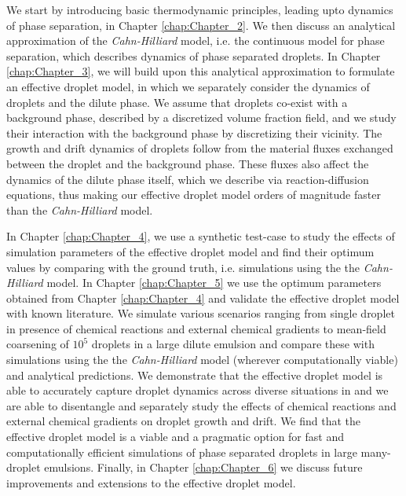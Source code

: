 We start by introducing basic thermodynamic principles, leading upto dynamics of phase separation, in Chapter \ref{chap:Chapter_2}.
We then discuss an analytical approximation of the \textit{Cahn-Hilliard} model, i.e. the continuous model for phase separation, which describes dynamics of phase separated droplets.
In Chapter \ref{chap:Chapter_3}, we will build upon this analytical approximation to formulate an effective droplet model, in which we separately consider the dynamics of droplets and the dilute phase.
We assume that droplets co-exist with a background phase, described by a discretized volume fraction field, and we study their interaction with the background phase by discretizing their vicinity.
The growth and drift dynamics of droplets follow from the material fluxes exchanged between the droplet and the background phase.
These fluxes also affect the dynamics of the dilute phase itself, which we describe via reaction-diffusion equations, thus making our effective droplet model orders of magnitude faster than the \textit{Cahn-Hilliard} model.

In Chapter \ref{chap:Chapter_4}, we use a synthetic test-case to study the effects of simulation parameters of the effective droplet model and find their optimum values by comparing with the ground truth, i.e. simulations using the the \textit{Cahn-Hilliard} model.
In Chapter \ref{chap:Chapter_5} we use the optimum parameters obtained from Chapter \ref{chap:Chapter_4} and validate the effective droplet model with known literature.
We simulate various scenarios ranging from single droplet in presence of chemical reactions and external chemical gradients to mean-field coarsening of $10^5$ droplets in a large dilute emulsion and compare these with simulations using the the \textit{Cahn-Hilliard} model (wherever computationally viable) and analytical predictions.
We demonstrate that the effective droplet model is able to accurately capture droplet dynamics across diverse situations in and we are able to disentangle and separately study the effects of chemical reactions and external chemical gradients on droplet growth and drift.
We find that the effective droplet model is a viable and a pragmatic option for fast and computationally efficient simulations of phase separated droplets in large many-droplet emulsions.
Finally, in Chapter \ref{chap:Chapter_6} we discuss future improvements and extensions to the effective droplet model.



